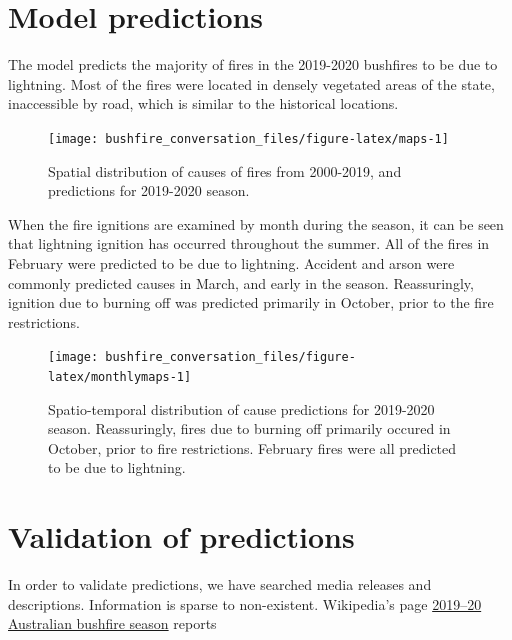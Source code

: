 \documentclass[
  11pt,
  a4paper,
]{article}
\begin{document}
\hypertarget{models}{%
\section{Model predictions}\label{models}}

The model predicts the majority of fires in the 2019-2020 bushfires to be due to lightning. Most of the fires were located in densely vegetated areas of the state, inaccessible by road, which is similar to the historical locations.

\begin{figure}[H]

{\centering \texttt{[image: bushfire\_conversation\_files/figure-latex/maps-1]} 

}

\caption{Spatial distribution of causes of fires from 2000-2019, and predictions for 2019-2020 season.}\label{fig:maps}
\end{figure}

When the fire ignitions are examined by month during the season, it can be seen that lightning ignition has occurred throughout the summer. All of the fires in February were predicted to be due to lightning. Accident and arson were commonly predicted causes in March, and early in the season. Reassuringly, ignition due to burning off was predicted primarily in October, prior to the fire restrictions.

\begin{figure}[H]

{\centering \texttt{[image: bushfire\_conversation\_files/figure-latex/monthlymaps-1]} 

}

\caption{Spatio-temporal distribution of cause predictions for 2019-2020 season. Reassuringly, fires due to burning off primarily occured in October, prior to fire restrictions. February fires were all predicted to be due to lightning.}\label{fig:monthlymaps}
\end{figure}

\hypertarget{validation-of-predictions}{%
\section*{Validation of predictions}\label{validation-of-predictions}}

In order to validate predictions, we have searched media releases and descriptions. Information is sparse to non-existent. Wikipedia's page \href{https://en.wikipedia.org/wiki/2019–20_Australian_bushfire_season}{2019--20 Australian bushfire season} reports
\end{document}
